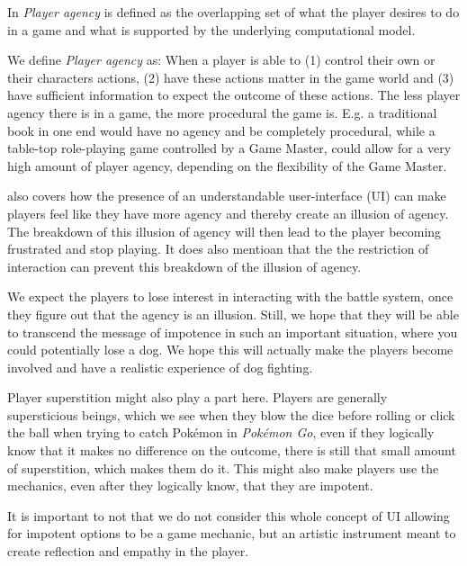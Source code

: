In \cite{wardrip2009agency} \textit{Player agency} is defined as the overlapping set of what the player desires to do in a game and what is supported by the underlying computational model.\

We define \textit{Player agency} as: When a player is able to (1) control their own or their characters actions, (2) have these actions matter in the game world and (3) have sufficient information to expect the outcome of these actions. The less player agency there is in a game, the more procedural the game is. E.g. a traditional book in one end would have no agency and be completely procedural, while a table-top role-playing game controlled by a Game Master, could allow for a very high amount of player agency, depending on the flexibility of the Game Master.\

\cite{wardrip2009agency} also covers how the presence of an understandable user-interface (UI) can make players feel like they have more agency and thereby create an illusion of agency. The breakdown of this illusion of agency will then lead to the player becoming frustrated and stop playing. It does also mentioan that the the restriction of interaction can prevent this breakdown of the illusion of agency.\

We expect the players to lose interest in interacting with the battle system, once they figure out that the agency is an illusion. Still, we hope that they will be able to transcend the message of impotence in such an important situation, where you could potentially lose a dog. 
We hope this will actually make the players become involved and have a realistic experience of dog fighting. \

Player superstition might also play a part here. Players are generally supersticious beings, which we see when they blow the dice before rolling or click the ball when trying to catch Pok{\'e}mon in \textit{Pok{\'e}mon Go}, even if they logically know that it makes no difference on the outcome, there is still that small amount of superstition, which makes them do it. This might also make players use the mechanics, even after they logically know, that they are impotent.\

It is important to not that we do not consider this whole concept of UI allowing for impotent options to be a game mechanic, but an artistic instrument meant to create reflection and empathy in the player. \
